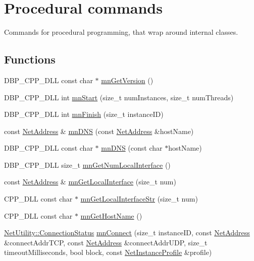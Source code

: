\hypertarget{group__proc_commands}{
\section{Procedural commands}
\label{group__proc_commands}
}


Commands for procedural programming, that wrap around internal classes.  


\subsection*{Functions}
\begin{DoxyCompactItemize}
\item 
DBP\_\-CPP\_\-DLL const char $\ast$ \hyperlink{group__proc_commands_gaef8fabefb36ea01174c25b6f49aa5650}{mnGetVersion} ()
\item 
DBP\_\-CPP\_\-DLL int \hyperlink{group__proc_commands_gac6c722451c4ba1f4077414b1fb80aaeb}{mnStart} (size\_\-t numInstances, size\_\-t numThreads)
\item 
DBP\_\-CPP\_\-DLL int \hyperlink{group__proc_commands_gac852ff7aa925290861cbcc1fb95cd874}{mnFinish} (size\_\-t instanceID)
\item 
const \hyperlink{class_net_address}{NetAddress} \& \hyperlink{group__proc_commands_ga079ccfaa9e1271d0aae5bf4483854035}{mnDNS} (const \hyperlink{class_net_address}{NetAddress} \&hostName)
\item 
DBP\_\-CPP\_\-DLL const char $\ast$ \hyperlink{group__proc_commands_ga301162e293cb12262ccd4b305f267f0e}{mnDNS} (const char $\ast$hostName)
\item 
DBP\_\-CPP\_\-DLL size\_\-t \hyperlink{group__proc_commands_ga476a722d849ef0062aa8e25f2cf4ccd3}{mnGetNumLocalInterface} ()
\item 
const \hyperlink{class_net_address}{NetAddress} \& \hyperlink{group__proc_commands_ga0c953533800374f59c5771f6ade976c6}{mnGetLocalInterface} (size\_\-t num)
\item 
CPP\_\-DLL const char $\ast$ \hyperlink{group__proc_commands_ga8f4a3f98a801a11b84c416ba7f847362}{mnGetLocalInterfaceStr} (size\_\-t num)
\item 
CPP\_\-DLL const char $\ast$ \hyperlink{group__proc_commands_gad5c1f5e78e84a88300ba571374ad45f9}{mnGetHostName} ()
\item 
\hyperlink{class_net_utility_a7eae52138f8bd597ffc67ebf07e86b6d}{NetUtility::ConnectionStatus} \hyperlink{group__proc_commands_ga6ffd3536c34f39d9cacd3eb06cf41d79}{mnConnect} (size\_\-t instanceID, const \hyperlink{class_net_address}{NetAddress} \&connectAddrTCP, const \hyperlink{class_net_address}{NetAddress} \&connectAddrUDP, size\_\-t timeoutMilliseconds, bool block, const \hyperlink{class_net_instance_profile}{NetInstanceProfile} \&profile)

\end{DoxyCompactItemize}
